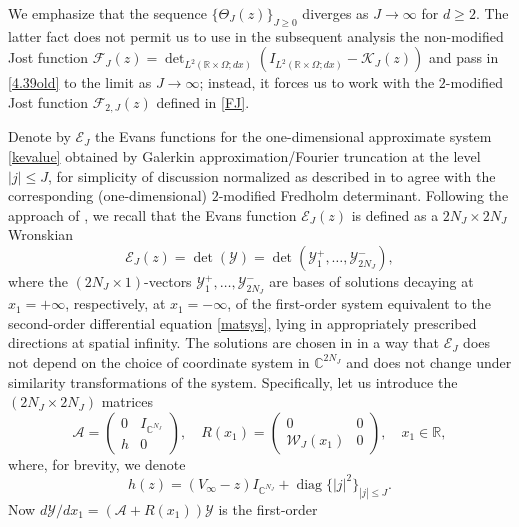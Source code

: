 \begin{remark}\label{remtrKJ} 
We emphasize that the sequence $\{\Theta_J(z)\}_{J{\geqslant}0}$ diverges
as $J\to\infty$ for $d{\geqslant}2$. The latter fact does not permit us to
use in the subsequent analysis the non-modified Jost function
${{\mathcal F}}_J(z)={\det}_{L^2({{\mathbb{R}}}\times\Omega; dx)}
(I_{L^2({{\mathbb{R}}}\times\Omega; dx)}- {{\mathcal K}}_J(z))$ and pass in \eqref{4.39old}
to the limit as $J\to\infty$; instead, it forces us to work with the 
$2$-modified Jost function ${{\mathcal F}}_{2,J}(z)$ defined in \eqref{FJ}.
\end{remark}

Denote by ${{\mathcal E}}_J$ the Evans functions for the one-dimensional
approximate system \eqref{kevalue} obtained by Galerkin
approximation/Fourier truncation at the level $|j|{\leqslant} J$,
for simplicity of discussion normalized as described in \cite{GLM07}
to agree with the corresponding (one-dimensional) $2$-modified
Fredholm determinant.
Following the approach of \cite{GLM07}, we recall that the
Evans function ${{\mathcal E}}_J(z)$ is defined as a
$2N_J\times 2N_J$ Wronskian
\begin{equation}\label{defEvfnct}
{{\mathcal E}}_J(z) =\det ({{\mathcal Y}})=\det({{\mathcal Y}}_1^+, \dots, {{\mathcal Y}}_{2N_J}^-),
\end{equation}
where the $(2N_J\times 1)$-vectors ${{\mathcal Y}}_1^+, \dots, {{\mathcal Y}}_{2N_J}^-$
are bases of solutions decaying at $x_1=+\infty$, respectively, at
$x_1=-\infty$, of the first-order system equivalent to the second-order differential
equation \eqref{matsys}, lying in appropriately prescribed directions at spatial
infinity. The solutions are chosen in \cite{GLM07}
in a way that ${{\mathcal E}}_J$ does not depend on the choice
of coordinate system in ${{\mathbb{C}}}^{2N_J}$ and does not change
under similarity transformations of the system. Specifically, let us introduce the $(2N_J\times 2N_J)$
matrices
\begin{equation}\label{defAR}
{{\mathcal A}} =\begin{pmatrix}0&I_{{{\mathbb{C}}}^{N_J}}\\ h&0\end{pmatrix},\quad
R(x_1) =\begin{pmatrix}0&0\\{{\mathcal W}}_J(x_1)&0\end{pmatrix}, \quad x_1\in{{\mathbb{R}}},
\end{equation}
where, for brevity, we denote
\begin{equation}\label{defnh}
h(z) =(V_\infty-z)I_{{{\mathbb{C}}}^{N_J}}+ \operatorname{diag}\big\{|j|^2\big\}_{|j|{\leqslant} J}.
\end{equation} Now $d {{\mathcal Y}}/d x_1=({{\mathcal A}}+R(x_1)){{\mathcal Y}}$ is the first-order
